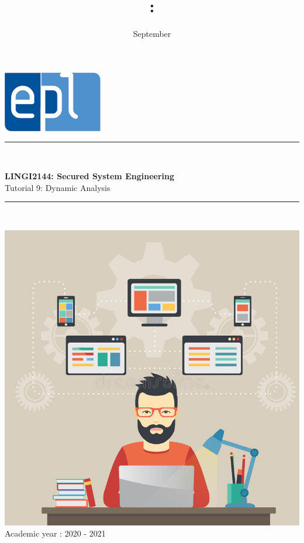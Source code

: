 \documentclass{article}
\title{\codecourse : \titlecourse}
\author{\othor}
\date{September \year}
\newcommand{\codecourse}{LINGI2144}
\newcommand{\titlecourse}{Secured System Engineering}
\newcommand{\ayear}{2020 - 2021}
\begin{document}
        \hfill\includegraphics[scale=0.5]{image/logoepl.png}
        
        \vspace*{\fill}
            
        \begin{center}
        
            \rule{1\textwidth}{1pt}\\
	            \vspace{0.5\baselineskip}
		            \begin{LARGE}
	                	\textbf{\codecourse : \titlecourse}\\
	                	Tutorial 9: Dynamic Analysis
		            \end{LARGE}
		        \vspace{0.5\baselineskip}       
	        \rule{1\textwidth}{1pt}\\
	        
	        \vspace{0.5\baselineskip}
	        
	        \includegraphics[scale=1.5]{image/MCP.jpg}\\

	        \vspace{0.5\baselineskip}
	            Academic year : \ayear\\
                
		\end{center}
		
\end{document}
